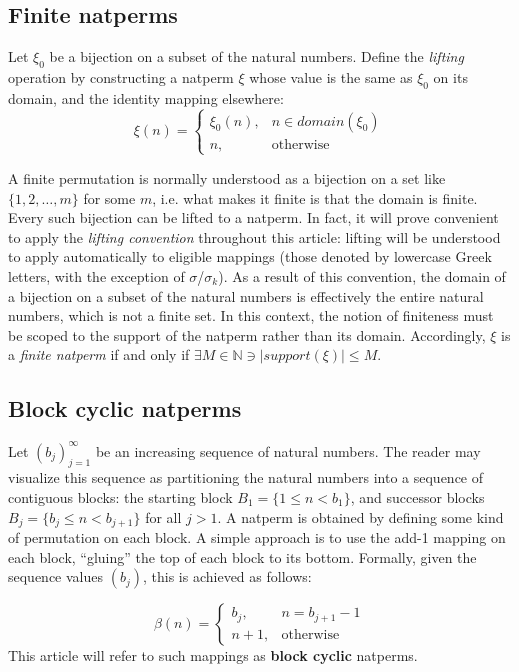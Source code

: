 \documentclass[12pt,reqno]{article}
\begin{document}
\subsection{Finite natperms}

Let $\xi_0$ be a bijection on a subset of the natural numbers. Define the \textit{lifting} operation by constructing a natperm $\xi$ whose value is the same as $\xi_0$ on its domain, and the identity mapping elsewhere:
\begin{equation}
  \xi(n) = \begin{cases}
    \xi_0(n), & n \in domain(\xi_0) \\
    n, & \text{otherwise}
  \end{cases}
\end{equation}

A finite permutation is normally understood as a bijection on a set like $\{ 1, 2, \ldots, m \}$ for some $m$, i.e. what makes it finite is that the domain is finite. Every such bijection can be lifted to a natperm. In fact, it will prove convenient to apply the \textit{lifting convention} throughout this article: lifting will be understood to apply automatically to eligible mappings (those denoted by lowercase Greek letters, with the exception of $\sigma$/$\sigma_k$). As a result of this convention, the domain of a bijection on a subset of the natural numbers is effectively the entire natural numbers, which is not a finite set. In this context, the notion of finiteness must be scoped to the support of the natperm rather than its domain. Accordingly, $\xi$ is a \textit{finite natperm} if and only if $\exists M \in \mathbb{N} \ni | support(\xi) | \leq M$.

\subsection{Block cyclic natperms}

Let $(b_j)_{j=1}^{\infty}$ be an increasing sequence of natural numbers. The reader may visualize this sequence as partitioning the natural numbers into a sequence of contiguous blocks: the starting block $B_1 = \{ 1 \leq n < b_1 \}$, and successor blocks $B_j = \{ b_j \leq n < b_{j+1} \}$ for all $j > 1$. A natperm is obtained by defining some kind of permutation on each block. A simple approach is to use the add-1 mapping on each block, ``gluing'' the top of each block to its bottom. Formally, given the sequence values $(b_j)$, this is achieved as follows:

\begin{equation}
  \beta(n) = \begin{cases}
    b_j, & n = b_{j+1} - 1 \\
    n + 1, & \text{otherwise}
  \end{cases}
\end{equation}
This article will refer to such mappings as \textbf{block cyclic} natperms. 
\end{document}
